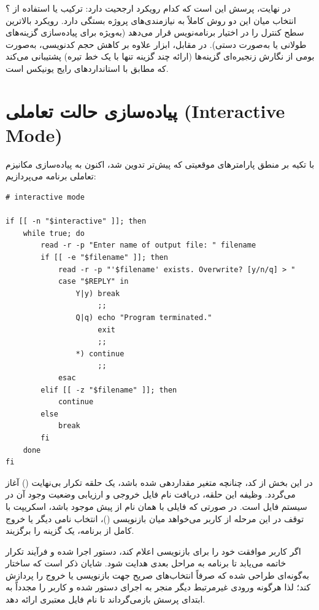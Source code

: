 در نهایت، پرسش این است که کدام رویکرد ارجحیت دارد: ترکیب  یا استفاده از ؟ انتخاب میان این دو روش کاملاً به نیازمندی‌های پروژه بستگی دارد. رویکرد  بالاترین سطح کنترل را در اختیار برنامه‌نویس قرار می‌دهد (به‌ویژه برای پیاده‌سازی گزینه‌های طولانی یا  به‌صورت دستی). در مقابل، ابزار  علاوه بر کاهش حجم کدنویسی، به‌صورت بومی از نگارش زنجیره‌ای گزینه‌ها (ارائه چند گزینه تنها با یک خط تیره) پشتیبانی می‌کند که مطابق با استانداردهای رایج یونیکس است.

\section{پیاده‌سازی حالت تعاملی (Interactive Mode)}

با تکیه بر منطق پارامترهای موقعیتی که پیش‌تر تدوین شد، اکنون به پیاده‌سازی مکانیزم تعاملی برنامه می‌پردازیم:

\begin{latin}
\begin{lstlisting}
# interactive mode

if [[ -n "$interactive" ]]; then
    while true; do
        read -r -p "Enter name of output file: " filename
        if [[ -e "$filename" ]]; then
            read -r -p "'$filename' exists. Overwrite? [y/n/q] > "
            case "$REPLY" in
                Y|y) break
                     ;;
                Q|q) echo "Program terminated."
                     exit
                     ;;
                *) continue
                     ;;
            esac
        elif [[ -z "$filename" ]]; then
            continue
        else
            break
        fi
    done
fi
\end{lstlisting}
\end{latin}

در این بخش از کد، چنانچه متغیر  مقداردهی شده باشد، یک حلقه تکرار بی‌نهایت () آغاز می‌گردد. وظیفه این حلقه، دریافت نام فایل خروجی و ارزیابی وضعیت وجود آن در سیستم فایل است. در صورتی که فایلی با همان نام از پیش موجود باشد، اسکریپت با توقف در این مرحله از کاربر می‌خواهد میان بازنویسی ()، انتخاب نامی دیگر یا خروج کامل از برنامه، یک گزینه را برگزیند.

اگر کاربر موافقت خود را برای بازنویسی اعلام کند، دستور  اجرا شده و فرآیند تکرار خاتمه می‌یابد تا برنامه به مراحل بعدی هدایت شود. شایان ذکر است که ساختار  به‌گونه‌ای طراحی شده که صرفاً انتخاب‌های صریح جهت بازنویسی یا خروج را پردازش کند؛ لذا هرگونه ورودی غیرمرتبط دیگر منجر به اجرای دستور  شده و کاربر را مجدداً به ابتدای پرسش بازمی‌گرداند تا نام فایل معتبری ارائه دهد.

